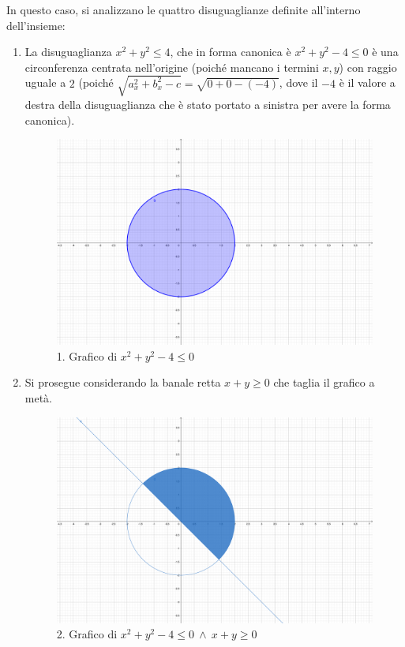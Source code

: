 \documentclass[a4paper]{article}
\begin{document}
	In questo caso, si analizzano le quattro disuguaglianze definite all'interno dell'insieme:
	\begin{enumerate}
		\item La disuguaglianza $x^{2} + y^{2} \le 4$, che in forma canonica è $x^{2} + y^{2} - 4 \le 0$ è una circonferenza centrata nell'origine (poiché mancano i termini $x,y$) con raggio uguale a $2$ (poiché $\sqrt{a_{x}^{2} + b_{x}^{2} - c} = \sqrt{0 + 0 - \left(-4\right)}$, dove il $-4$ è il valore a destra della disuguaglianza che è stato portato a sinistra per avere la forma canonica).
		\begin{figure}[!htp]
			\centering
			\includegraphics[width=\textwidth]{img/grafico-ex6-1.pdf}
			\caption*{1. Grafico di $x^{2} + y^{2} - 4 \le 0$}
		\end{figure}

		\item Si prosegue considerando la banale retta $x+y \ge 0$ che taglia il grafico a metà.
		\begin{figure}[!htp]
			\centering
			\includegraphics[width=\textwidth]{img/grafico-ex6-2.pdf}
			\caption*{2. Grafico di $x^{2} + y^{2} - 4 \le 0 \: \land \: x+y \ge 0$}
		\end{figure}


\end{enumerate}
\end{document}
